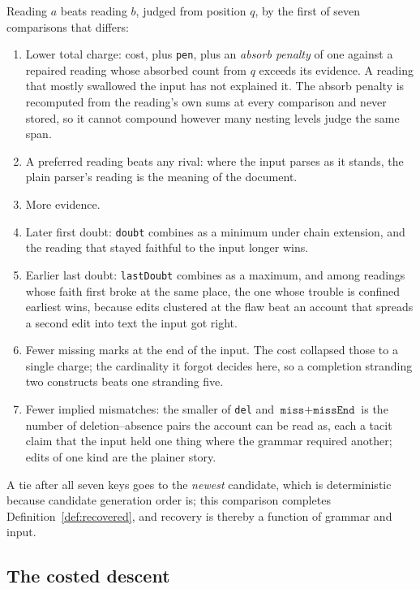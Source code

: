 \documentclass[manuscript]{acmart}
\newcommand{\cd}[1]{\texttt{#1}}
\begin{document}
Reading $a$ beats reading $b$, judged from position $q$, by the first of seven comparisons that differs:
\begin{enumerate}
    \item Lower total charge: cost, plus \cd{pen}, plus an \emph{absorb penalty} of one against a repaired reading whose absorbed count from $q$ exceeds its evidence. A reading that mostly swallowed the input has not explained it. The absorb penalty is recomputed from the reading's own sums at every comparison and never stored, so it cannot compound however many nesting levels judge the same span.
    \item A preferred reading beats any rival: where the input parses as it stands, the plain parser's reading is the meaning of the document.
    \item More evidence.
    \item Later first doubt: \cd{doubt} combines as a minimum under chain extension, and the reading that stayed faithful to the input longer wins.
    \item Earlier last doubt: \cd{lastDoubt} combines as a maximum, and among readings whose faith first broke at the same place, the one whose trouble is confined earliest wins, because edits clustered at the flaw beat an account that spreads a second edit into text the input got right.
    \item Fewer missing marks at the end of the input. The cost collapsed those to a single charge; the cardinality it forgot decides here, so a completion stranding two constructs beats one stranding five.
    \item Fewer implied mismatches: the smaller of \cd{del} and $\cd{miss} + \cd{missEnd}$ is the number of deletion--absence pairs the account can be read as, each a tacit claim that the input held one thing where the grammar required another; edits of one kind are the plainer story.
\end{enumerate}
A tie after all seven keys goes to the \emph{newest} candidate, which is deterministic because candidate generation order is; this comparison completes Definition~\ref{def:recovered}, and recovery is thereby a function of grammar and input.

\subsection{The costed descent}
\label{sec:descent}
\end{document}

